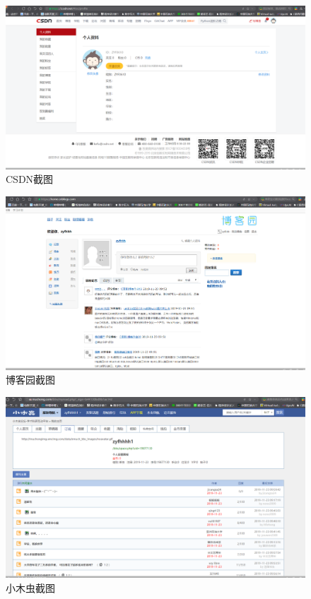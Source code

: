 \documentclass{article}
\begin{document}
\begin{figure}[h!]
	\centering
	\includegraphics[scale=0.4]{CSDN.PNG}
	\caption{CSDN截图}
	\label{fig:ggwrq.jpg}
\end{figure}

\begin{figure}[h!]
	\centering
	\includegraphics[scale=0.4]{boge.PNG}
	\caption{博客园截图}
	\label{fig:ggwrqgc.jpg}
\end{figure}

\begin{figure}[h!]
	\centering
	\includegraphics[scale=0.5]{bug.PNG}
	\caption{小木虫截图}
	\label{fig:ggwwrqc.jpg}
\end{figure}


\hspace*{\fill} \\




\end{document}
